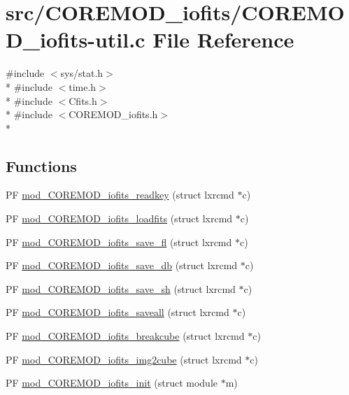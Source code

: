 \hypertarget{src_2COREMOD__iofits_2COREMOD__iofits-util_8c}{\section{src/\+C\+O\+R\+E\+M\+O\+D\+\_\+iofits/\+C\+O\+R\+E\+M\+O\+D\+\_\+iofits-\/util.c File Reference}
\label{src_2COREMOD__iofits_2COREMOD__iofits-util_8c}
}
{\ttfamily \#include $<$sys/stat.\+h$>$}\\*
{\ttfamily \#include $<$time.\+h$>$}\\*
{\ttfamily \#include $<$Cfits.\+h$>$}\\*
{\ttfamily \#include $<$C\+O\+R\+E\+M\+O\+D\+\_\+iofits.\+h$>$}\\*
\subsection*{Functions}
\begin{DoxyCompactItemize}
\item 
P\+F \hyperlink{src_2COREMOD__iofits_2COREMOD__iofits-util_8c_aeb9dca3f78d29aea5c3a6995ec867ad0}{mod\+\_\+\+C\+O\+R\+E\+M\+O\+D\+\_\+iofits\+\_\+readkey} (struct lxrcmd $\ast$c)
\item 
P\+F \hyperlink{src_2COREMOD__iofits_2COREMOD__iofits-util_8c_a625ce3b17195d8e08f4319e4a6cac82d}{mod\+\_\+\+C\+O\+R\+E\+M\+O\+D\+\_\+iofits\+\_\+loadfits} (struct lxrcmd $\ast$c)
\item 
P\+F \hyperlink{src_2COREMOD__iofits_2COREMOD__iofits-util_8c_afa228e6c874d72f2e486870e0f27a76a}{mod\+\_\+\+C\+O\+R\+E\+M\+O\+D\+\_\+iofits\+\_\+save\+\_\+fl} (struct lxrcmd $\ast$c)
\item 
P\+F \hyperlink{src_2COREMOD__iofits_2COREMOD__iofits-util_8c_a3402a7c6e69aeae45f321efec080c91a}{mod\+\_\+\+C\+O\+R\+E\+M\+O\+D\+\_\+iofits\+\_\+save\+\_\+db} (struct lxrcmd $\ast$c)
\item 
P\+F \hyperlink{src_2COREMOD__iofits_2COREMOD__iofits-util_8c_a24e6f737b66283cfc8d8a2fa2e109e9c}{mod\+\_\+\+C\+O\+R\+E\+M\+O\+D\+\_\+iofits\+\_\+save\+\_\+sh} (struct lxrcmd $\ast$c)
\item 
P\+F \hyperlink{src_2COREMOD__iofits_2COREMOD__iofits-util_8c_a9edb0bb8746624d5e245d460f334e3ec}{mod\+\_\+\+C\+O\+R\+E\+M\+O\+D\+\_\+iofits\+\_\+saveall} (struct lxrcmd $\ast$c)
\item 
P\+F \hyperlink{src_2COREMOD__iofits_2COREMOD__iofits-util_8c_a651d22cbf69a99c25e305e370a5fed25}{mod\+\_\+\+C\+O\+R\+E\+M\+O\+D\+\_\+iofits\+\_\+breakcube} (struct lxrcmd $\ast$c)
\item 
P\+F \hyperlink{src_2COREMOD__iofits_2COREMOD__iofits-util_8c_a3b242840565361a6f520bab50325e4f5}{mod\+\_\+\+C\+O\+R\+E\+M\+O\+D\+\_\+iofits\+\_\+img2cube} (struct lxrcmd $\ast$c)
\item 
P\+F \hyperlink{src_2COREMOD__iofits_2COREMOD__iofits-util_8c_a41c5c637eb88eb38eff072058b58e0e5}{mod\+\_\+\+C\+O\+R\+E\+M\+O\+D\+\_\+iofits\+\_\+init} (struct module $\ast$m)
\end{DoxyCompactItemize}
